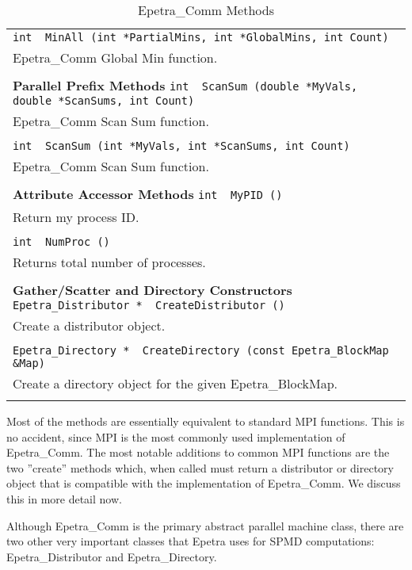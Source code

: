 \documentclass[12pt,relax]{EpetraUserGuide}
\newcommand{\comm}{Epetra\_Comm}
\newcommand{\blockmap}{Epetra\_BlockMap}
\newcommand{\distributor}{Epetra\_Distributor}
\newcommand{\directory}{Epetra\_Directory}
\begin{document}
\begin{table}
\begin{center}
\begin{tabular}{ | p{15cm} | }
 \\
\verb!int  MinAll (int *PartialMins, int *GlobalMins, int Count)!\\
  \comm{} Global Min function. \\
 \\
{\bf Parallel Prefix Methods }
\verb!int  ScanSum (double *MyVals, double *ScanSums, int Count)!\\
  \comm{} Scan Sum function. \\
 \\
\verb!int  ScanSum (int *MyVals, int *ScanSums, int Count)!\\
  \comm{} Scan Sum function. \\
 \\
{\bf Attribute Accessor Methods}
\verb!int  MyPID ()!\\
  Return my process ID. \\
 \\
\verb!int  NumProc ()!\\
  Returns total number of processes. \\
 \\
{\bf Gather/Scatter and Directory Constructors }
\verb!Epetra_Distributor *  CreateDistributor ()!\\
  Create a distributor object. \\
 \\
\verb!Epetra_Directory *  CreateDirectory (const Epetra_BlockMap &Map)!\\
  Create a directory object for the given \blockmap{}. \\
 \\
\hline
\end{tabular}
\caption{\comm{} Methods}
\label{Table:CommMethods}
\end{center}
\end{table}
Most of the methods are essentially equivalent to standard MPI functions.
This is no accident, since MPI is the most commonly used implementation of
\comm{}.  The most notable additions to common MPI functions are the two
''create'' methods which, when called must return a distributor or directory
object that is compatible with the implementation of \comm{}.  We discuss this
in more detail now.

Although \comm{} is the primary abstract parallel machine class, there are two
other very important classes that Epetra uses for SPMD computations:
\distributor{} and \directory{}.
\end{document}
